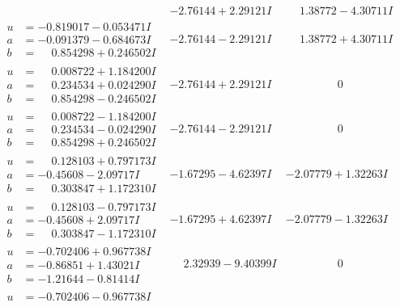 \documentclass[1p]{elsarticle_modified}
\theoremstyle{definition}
\begin{document}
$$\begin{array}{c|c|c}
 & -2.76144 + 2.29121 I & \phantom{-}1.38772 - 4.30711 I \\ \hline\begin{aligned}
u &= -0.819017 - 0.053471 I \\
a &= -0.091379 - 0.684673 I \\
b &= \phantom{-}0.854298 + 0.246502 I\end{aligned}
 & -2.76144 - 2.29121 I & \phantom{-}1.38772 + 4.30711 I \\ \hline\begin{aligned}
u &= \phantom{-}0.008722 + 1.184200 I \\
a &= \phantom{-}0.234534 + 0.024290 I \\
b &= \phantom{-}0.854298 - 0.246502 I\end{aligned}
 & -2.76144 + 2.29121 I & \phantom{-0.000000 } 0 \\ \hline\begin{aligned}
u &= \phantom{-}0.008722 - 1.184200 I \\
a &= \phantom{-}0.234534 - 0.024290 I \\
b &= \phantom{-}0.854298 + 0.246502 I\end{aligned}
 & -2.76144 - 2.29121 I & \phantom{-0.000000 } 0 \\ \hline\begin{aligned}
u &= \phantom{-}0.128103 + 0.797173 I \\
a &= -0.45608 - 2.09717 I \\
b &= \phantom{-}0.303847 + 1.172310 I\end{aligned}
 & -1.67295 - 4.62397 I & -2.07779 + 1.32263 I \\ \hline\begin{aligned}
u &= \phantom{-}0.128103 - 0.797173 I \\
a &= -0.45608 + 2.09717 I \\
b &= \phantom{-}0.303847 - 1.172310 I\end{aligned}
 & -1.67295 + 4.62397 I & -2.07779 - 1.32263 I \\ \hline\begin{aligned}
u &= -0.702406 + 0.967738 I \\
a &= -0.86851 + 1.43021 I \\
b &= -1.21644 - 0.81414 I\end{aligned}
 & \phantom{-}2.32939 - 9.40399 I & \phantom{-0.000000 } 0 \\ \hline\begin{aligned}
u &= -0.702406 - 0.967738 I \\

\end{aligned}
\end{array}$$
\end{document}
